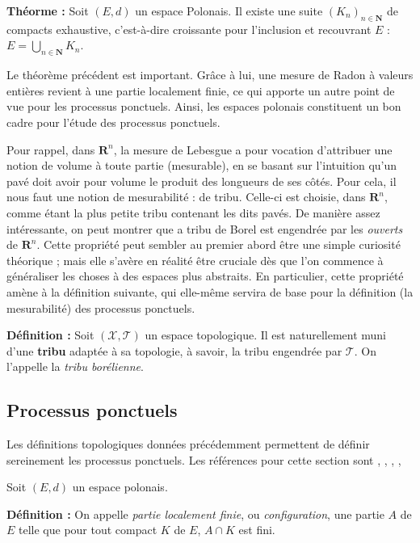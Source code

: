 \documentclass[12pt]{article}
\begin{document}
\textbf{Théorme :} Soit $(E,d)$ un espace Polonais. Il existe une suite $(K_n)_{n\in \mathbf N}$ de compacts exhaustive, c'est-à-dire croissante pour l'inclusion et recouvrant $E$ : $ E = \bigcup\limits_{n \in \mathbf N} K_n$.

Le théorème précédent est important. Grâce à lui, une mesure de Radon à valeurs entières revient à une partie localement finie, ce qui apporte un autre point de vue pour les processus ponctuels. Ainsi, les espaces polonais constituent un bon cadre pour l'étude des processus ponctuels.

Pour rappel, dans $ \mathbf R^n $, la mesure de Lebesgue a pour vocation d'attribuer une notion de volume à toute partie (mesurable), en se basant sur l'intuition qu'un pavé doit avoir pour volume le produit des longueurs de ses côtés. Pour cela, il nous faut une notion de mesurabilité : de tribu. Celle-ci est choisie, dans $ \mathbf R^n$, comme étant la plus petite tribu contenant les dits pavés. De manière assez intéressante, on peut montrer que a tribu de Borel est engendrée par les \textit{ouverts} de $\mathbf R^n$. Cette propriété peut sembler au premier abord être une simple curiosité théorique ; mais elle s'avère en réalité être cruciale dès que l'on commence à généraliser les choses à des espaces plus abstraits. En particulier, cette propriété amène à la définition suivante, qui elle-même servira de base pour la définition (la mesurabilité) des processus ponctuels.

\textbf{Définition :} Soit $(\mathcal X, \mathcal T)$ un espace topologique. Il est naturellement muni d'une \textbf{tribu} adaptée à sa topologie, à savoir, la tribu engendrée par $ \mathcal T $. On l'appelle la \textit{tribu borélienne}.


\subsection{Processus ponctuels}

Les définitions topologiques données précédemment permettent de définir sereinement les processus ponctuels. Les références pour cette section sont \cite{PPBeyond2023}, \cite{Meliot2021}, \cite{PPIntro2003}, \cite{Lenard1973}, \cite{Lenard1975}

Soit $(E,d)$ un espace polonais.

\textbf{Définition :} On appelle \textit{partie localement finie}, ou \textit{configuration}, une partie $A$ de $E$ telle que pour tout compact $K$ de $E$, $ A \cap K$ est fini.
\end{document}
